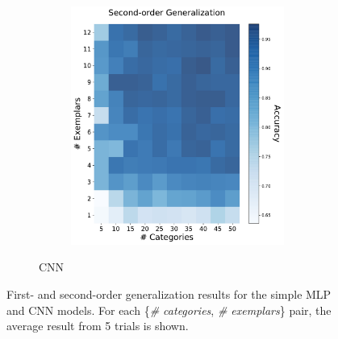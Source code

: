 \begin{figure}[h]
\begin{center}
\begin{subfigure}[b]{0.47\textwidth}
\begin{center}
\begin{subfigure}[b]{0.48\textwidth}
\begin{center}
                        \includegraphics[width=\textwidth]{figures/cnn_2order_accuracy.pdf}
                    \end{center}
                \end{subfigure}
            \end{center}
            \caption{CNN}
            \label{fig:cnn_results}
        \end{subfigure}
    \end{center}
    \caption{First- and second-order generalization results for the simple MLP and CNN models.
    For each \{\textit{\# categories}, \textit{\# exemplars}\} pair, the average result from
    5 trials is shown.}
    \label{fig:generalization_results}
\end{figure}